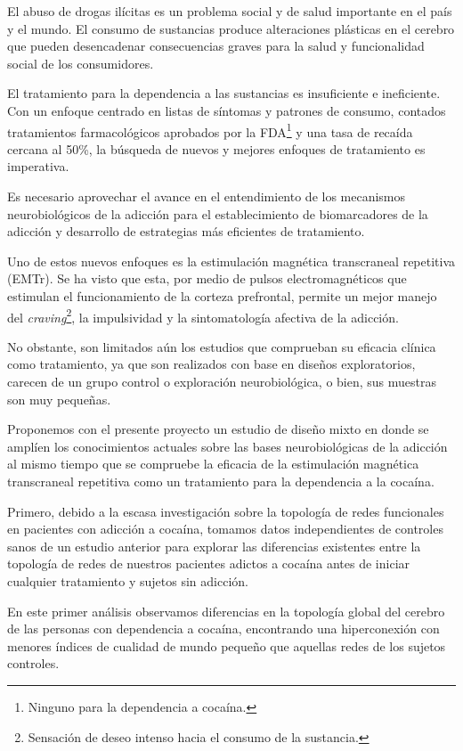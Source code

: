 El abuso de drogas ilícitas es un problema social y de salud importante en el país y el mundo.
El consumo de sustancias produce alteraciones plásticas en el
cerebro que pueden desencadenar consecuencias graves para la salud y funcionalidad
social de los consumidores. \par
El tratamiento para la dependencia a las sustancias es insuficiente e ineficiente.
Con un enfoque centrado en listas de síntomas y patrones de consumo, contados tratamientos farmacológicos aprobados por la FDA\footnote{Ninguno para la dependencia a cocaína.}
y una tasa de recaída cercana al 50\%, la búsqueda de nuevos y mejores enfoques de tratamiento es imperativa.\par
Es necesario aprovechar el avance en el entendimiento de los mecanismos neurobiológicos de la adicción para el establecimiento de biomarcadores de la adicción y desarrollo de estrategias más eficientes de tratamiento.\par
Uno de estos nuevos enfoques es la estimulación magnética transcraneal repetitiva (EMTr). Se ha visto que esta, por medio de pulsos electromagnéticos que estimulan el funcionamiento de la corteza prefrontal, permite un mejor manejo del \textit{craving}\footnote{Sensación de deseo intenso hacia el consumo de la sustancia.}, la impulsividad y la sintomatología afectiva de la adicción. \par
No obstante, son limitados aún los estudios que comprueban su eficacia clínica como tratamiento, ya que son realizados con base en diseños exploratorios, carecen de un grupo control o exploración neurobiológica, o bien, sus muestras son muy pequeñas.\par
Proponemos con el presente proyecto un estudio de diseño mixto en donde se amplíen los conocimientos actuales sobre las bases neurobiológicas de la adicción al mismo tiempo que se compruebe la eficacia de la estimulación magnética transcraneal repetitiva como un tratamiento para la dependencia a la cocaína.\par
Primero, debido a la escasa investigación sobre la topología de redes funcionales en pacientes con adicción a cocaína,  tomamos datos independientes de controles sanos de un estudio anterior para explorar las diferencias existentes entre la topología de redes de nuestros pacientes adictos a cocaína antes de iniciar cualquier tratamiento y sujetos sin adicción.\par
En este primer análisis observamos diferencias en la topología global del cerebro de las personas con dependencia a cocaína, encontrando una hiperconexión con menores índices de cualidad de mundo pequeño que aquellas redes de los sujetos controles.\par
